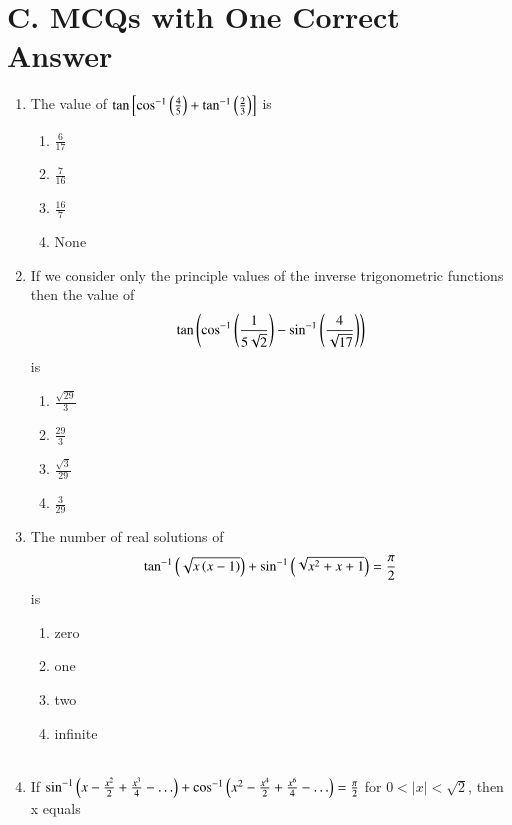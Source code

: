 \documentclass[journal,12pt,twocolumn,article]{IEEEtran}
\theoremstyle{remark}
\begin{document}
\section*{C. MCQs with One Correct Answer}
\begin{enumerate}
\item The value of $\tan \left[ \cos ^{-1}\left(\frac{4}{5}\right)+\tan^{-1}\left(\frac{2}{3}\right) \right]$ is
\hfill {}
\begin{multicols}{2}
\begin{enumerate}
\item $\frac{6}{17}$
\item $\frac{7}{16}$
\columnbreak
\item $\frac{16}{7}$
\item None
\end{enumerate}
\end{multicols}
\item If we consider only the principle values of the inverse trigonometric functions then the value of 
$$\tan \left(\cos ^{-1}\left(\frac{1}{5\sqrt{2}}\right)-\sin ^{-1}\left(\frac{4}{\sqrt{17}}\right)\right)$$ is
\hfill {}
\begin{multicols}{2}
\begin{enumerate}
\item $\frac{\sqrt{29}}{3}$ 
\item $\frac{29}{3}$
\columnbreak
\item $\frac{\sqrt{3}}{29}$ 
\item $\frac{3}{29}$ 
\end{enumerate}
\end{multicols}
\item The number of real solutions of 
$$\tan ^{-1}\left(\sqrt{x\left(x-1\right)}\right)+\sin ^{-1}\left(\sqrt{x^2+x+1}\right)=\frac{\pi}{2}$$ is 
\hfill {}
\begin{multicols}{2}
\begin{enumerate}
\item zero 
\item one 
\columnbreak
\item two 
\item infinite\\\\
\end{enumerate}
\end{multicols}
\item If $\sin ^{-1}\left(x-\frac{x^2}{2}+\frac{x^3}{4}-\ldots\right)+ \cos ^{-1}\left(x^2-\frac{x^4}{2}+\frac{x^6}{4}-\ldots\right)=\frac{\pi}{2}$ for $0<|x|<\sqrt{2}$, then x equals 

\end{enumerate}
\end{document}

